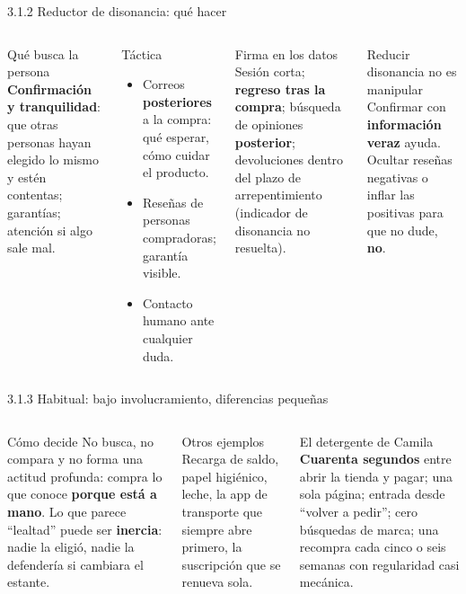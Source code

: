 \documentclass[aspectratio=169,xcolor=dvipsnames]{beamer}
\begin{document}
\begin{frame}{3.1.2 Reductor de disonancia: qué hacer}
\begin{columns}[T]
  \begin{block}{Qué busca la persona}
    \footnotesize \textbf{Confirmación y tranquilidad}: que otras personas hayan elegido lo mismo y estén contentas; garantías; atención si algo sale mal.
  \end{block}
  \begin{block}{Táctica}
    \footnotesize
    \begin{itemize}
      \item Correos \textbf{posteriores} a la compra: qué esperar, cómo cuidar el producto.
      \item Reseñas de personas compradoras; garantía visible.
      \item Contacto humano ante cualquier duda.
    \end{itemize}
  \end{block}
  \begin{exampleblock}{Firma en los datos}
    \footnotesize Sesión corta; \textbf{regreso tras la compra}; búsqueda de opiniones \textbf{posterior}; devoluciones dentro del plazo de arrepentimiento (indicador de disonancia no resuelta).
  \end{exampleblock}
  \begin{alertblock}{Reducir disonancia no es manipular}
    \footnotesize Confirmar con \textbf{información veraz} ayuda. Ocultar reseñas negativas o inflar las positivas para que no dude, \textbf{no}.
  \end{alertblock}
\end{columns}
\end{frame}

\begin{frame}{3.1.3 Habitual: bajo involucramiento, diferencias pequeñas}
\begin{columns}[T]
  \begin{block}{Cómo decide}
    \small No busca, no compara y no forma una actitud profunda: compra lo que conoce \textbf{porque está a mano}. Lo que parece \enquote{lealtad} puede ser \textbf{inercia}: nadie la eligió, nadie la defendería si cambiara el estante.
  \end{block}
  \begin{block}{Otros ejemplos}
    \small Recarga de saldo, papel higiénico, leche, la app de transporte que siempre abre primero, la suscripción que se renueva sola.
  \end{block}
  \begin{exampleblock}{El detergente de Camila}
    \small \textbf{Cuarenta segundos} entre abrir la tienda y pagar; una sola página; entrada desde \enquote{volver a pedir}; cero búsquedas de marca; una recompra cada cinco o seis semanas con regularidad casi mecánica.
  \end{exampleblock}
\end{columns}
\end{frame}
\end{document}
